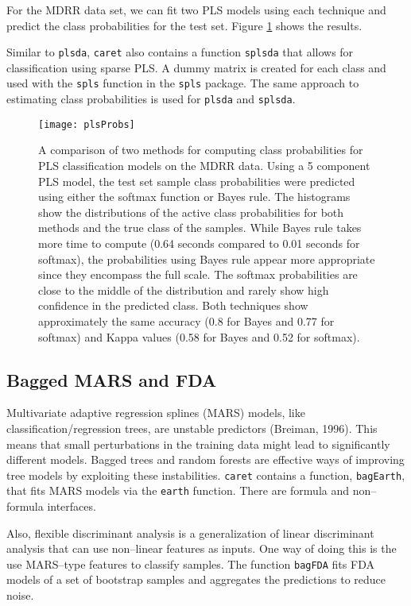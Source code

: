 \documentclass[12pt]{article}
\begin{document}
For the MDRR data set, we can fit two PLS models using each technique and predict the class probabilities for the test set. Figure \ref{f:plsProbs}  shows the results.

Similar to \texttt{plsda}, \texttt{caret} also contains a function \texttt{splsda} that allows for classification using sparse PLS. A dummy 
matrix is created for each class and used with the \texttt{spls} function in the \texttt{spls} package. The same approach to estimating class probabilities is used for \texttt{plsda} and \texttt{splsda}.


\begin{figure}
   \begin{center}		
      \texttt{[image: plsProbs]}
\caption{A comparison of two methods for computing class probabilities for PLS classification models on the MDRR data. Using a 5 component PLS model, the test set sample class probabilities were predicted using either the softmax function or Bayes rule. The histograms show the distributions of the active class probabilities for both methods and the true class of the samples. While Bayes rule takes more time to compute (0.64 seconds compared to 0.01 seconds for softmax), the probabilities using Bayes rule appear more appropriate since they encompass the full scale. The softmax probabilities are close to the middle of the distribution and rarely show high confidence in the predicted class. Both techniques show approximately the same accuracy (0.8 for Bayes and 0.77 for softmax) and Kappa values (0.58 for Bayes and 0.52 for softmax).}
      \label{f:plsProbs}       
   \end{center}
\end{figure}  

\subsection{Bagged MARS and FDA}

Multivariate adaptive regression splines (MARS) models, like classification/regression trees, are unstable predictors (Breiman, 1996). This means that small perturbations in the training data might lead to significantly different models. Bagged trees and random forests are effective ways of improving tree models by exploiting these instabilities. \texttt{caret} contains a function, \texttt{bagEarth}, that fits MARS models via the \texttt{earth} function. There are formula and non--formula interfaces. 

Also, flexible discriminant analysis is a generalization of linear discriminant analysis that can use non--linear features as inputs. One way of doing this is the use MARS--type features to classify samples. The function \texttt{bagFDA} fits FDA models of a set of bootstrap samples and aggregates the predictions to reduce noise.  
\end{document}
